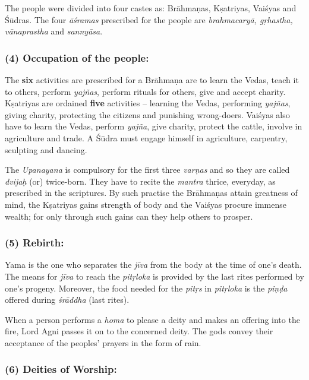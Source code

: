 The people were divided into four castes as: Brāhmaṇas, Kṣatriyas, Vaiśyas and Śūdras. The four \textit{āśramas} prescribed for the people are \textit{brahmacaryā, gṛhastha, vānaprastha} and \textit{sannyāsa}.


\subsubsection*{(4) Occupation of the people:}

\vskip -7pt

The \textbf{six} activities are prescribed for a Brāhmaṇa are to learn the Vedas, teach it to others, perform \textit{yajñas}, perform rituals for others, give and accept charity. Kṣatriyas are ordained \textbf{five} activities – learning the Vedas, performing \textit{yajñas}, giving charity, protecting the citizens and punishing wrong-doers. Vaiśyas also have to learn the Vedas, perform \textit{yajña}, give charity, protect the cattle, involve in agriculture and trade. A Śūdra must engage himself in agriculture, carpentry, sculpting and dancing.

The \textit{Upanayana} is compulsory for the first three \textit{varṇas} and so they are called \textit{dvijaḥ} (or) twice-born. They have to recite the \textit{mantra} thrice, everyday, as prescribed in the scriptures. By such practise the Brāhmaṇas attain greatness of mind, the Kṣatriyas gains strength of body and the Vaiśyas procure immense wealth; for only through such gains can they help others to prosper.


\subsubsection*{(5) Rebirth:}

\vskip -7pt

Yama is the one who separates the \textit{jīva} from the body at the time of one’s death. The means for \textit{jīva} to reach the \textit{pitṛloka} is provided by the last rites performed by one’s progeny. Moreover, the food needed for the \textit{pitṛs} in \textit{pitṛloka} is the \textit{piṇḍa} offered during \textit{śrāddha} (last rites).

When a person performs a \textit{homa} to please a deity and makes an offering into the fire, Lord Agni passes it on to the concerned deity. The gods convey their acceptance of the peoples’ prayers in the form of rain.


\subsubsection*{(6) Deities of Worship:}

